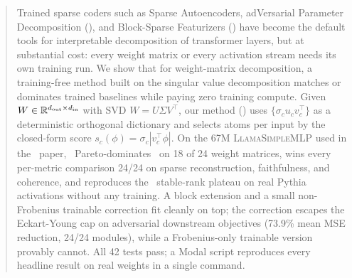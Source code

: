 \begin{abstract}
Trained sparse coders such as Sparse Autoencoders, adVersarial Parameter Decomposition (\vpd), and Block-Sparse Featurizers (\bsf) have become the default tools for interpretable decomposition of transformer layers, but at substantial cost: every weight matrix or every activation stream needs its own training run. We show that for weight-matrix decomposition, a training-free method built on the singular value decomposition matches or dominates trained baselines while paying zero training compute. Given $W \in \R^{d_\text{out} \times d_\text{in}}$ with SVD $W = U\Sigma V^\top$, our method (\svdomp) uses $\{\sigma_c u_c v_c^\top\}$ as a deterministic orthogonal dictionary and selects atoms per input by the closed-form score $s_c(\phi) = \sigma_c |v_c^\top \phi|$. On the 67M \textsc{LlamaSimpleMLP} used in the \vpd\ paper, \svdomp\ Pareto-dominates \vpd\ on 18 of 24 weight matrices, wins every per-metric comparison 24/24 on sparse reconstruction, faithfulness, and coherence, and reproduces the \bsf\ stable-rank plateau on real Pythia activations without any training. A block extension and a small non-Frobenius trainable correction fit cleanly on top; the correction escapes the Eckart-Young cap on adversarial downstream objectives (73.9\% mean MSE reduction, 24/24 modules), while a Frobenius-only trainable version provably cannot. All 42 tests pass; a Modal script reproduces every headline result on real weights in a single command.
\end{abstract}
